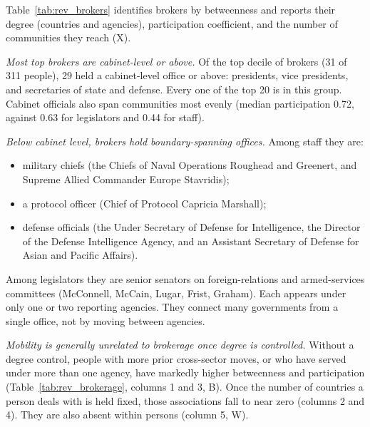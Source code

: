 \documentclass[11pt]{article}
\begin{document}
Table~\ref{tab:rev_brokers} identifies brokers by betweenness and reports their degree (countries and agencies), participation coefficient, and the number of communities they reach (X).

\emph{Most top brokers are cabinet-level or above.} Of the top decile of brokers (31 of 311 people), 29 held a cabinet-level office or above: presidents, vice presidents, and secretaries of state and defense. Every one of the top 20 is in this group. Cabinet officials also span communities most evenly (median participation 0.72, against 0.63 for legislators and 0.44 for staff).

\emph{Below cabinet level, brokers hold boundary-spanning offices.} Among staff they are:
\begin{itemize}
\item military chiefs (the Chiefs of Naval Operations Roughead and Greenert, and Supreme Allied Commander Europe Stavridis);
\item a protocol officer (Chief of Protocol Capricia Marshall);
\item defense officials (the Under Secretary of Defense for Intelligence, the Director of the Defense Intelligence Agency, and an Assistant Secretary of Defense for Asian and Pacific Affairs).
\end{itemize}
Among legislators they are senior senators on foreign-relations and armed-services committees (McConnell, McCain, Lugar, Frist, Graham). Each appears under only one or two reporting agencies. They connect many governments from a single office, not by moving between agencies.

\begin{table}[t]
\centering\footnotesize\setlength{\tabcolsep}{4pt}
\caption{Career mobility and brokerage, with and without degree (person-year). OLS; standard errors clustered by person. Outcomes: betweenness ($\times 100$) and participation coefficient in the year-$t$ recipient-country network. Sample: person-years with at least one gift from a known country and a dated career. Mobility measures use spells and gifts before $t$.}\label{tab:rev_brokerage}

\end{table}

\emph{Mobility is generally unrelated to brokerage once degree is controlled.} Without a degree control, people with more prior cross-sector moves, or who have served under more than one agency, have markedly higher betweenness and participation (Table~\ref{tab:rev_brokerage}, columns 1 and 3, B). Once the number of countries a person deals with is held fixed, those associations fall to near zero (columns 2 and 4). They are also absent within persons (column 5, W).
\end{document}
